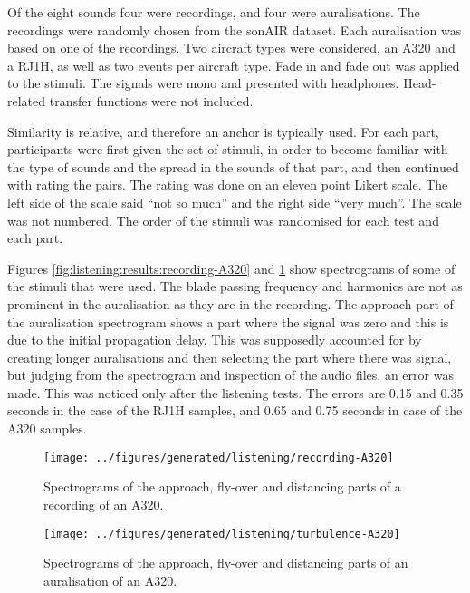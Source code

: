 Of the eight sounds four were recordings, and four were auralisations.
The recordings were randomly chosen from the sonAIR dataset. Each
auralisation was based on one of the recordings. Two aircraft types were
considered, an A320 and a RJ1H, as well as two events per aircraft type.
Fade in and fade out was applied to the stimuli. The signals were mono and
presented with headphones. Head-related transfer functions were not included.

Similarity is relative, and therefore an anchor is typically used. For each
part, participants were first given the set of stimuli, in order to become
familiar with the type of sounds and the spread in the sounds of that part, and
then continued with rating the pairs. The rating was done on an eleven point
Likert scale. The left side of the scale said ``not so much'' and the right side
``very much''. The scale was not numbered. The order of the stimuli was
randomised for each test and each part.

Figures \ref{fig:listening:results:recording-A320} and
\ref{fig:listening:results:simulation-A320} show spectrograms of some of the
stimuli that were used. The blade passing frequency and harmonics are not as
prominent in the auralisation as they are in the recording. The approach-part of
the auralisation spectrogram shows a part where the signal was zero and this is
due to the initial propagation delay. This was supposedly accounted for by
creating longer auralisations and then selecting the part where there was
signal, but judging from the spectrogram and inspection of the audio files, an
error was made. This was noticed only after the listening tests. The errors are
0.15 and 0.35 seconds in the case of the RJ1H samples, and 0.65 and 0.75 seconds
in case of the A320 samples.


\begin{figure}[H]
  \centering
  \texttt{[image: ../figures/generated/listening/recording-A320]}
  \caption{Spectrograms of the approach, fly-over and distancing parts of a recording of an A320.}
  \label{fig:listening:results:recording-A320}
%
  \centering
  \texttt{[image: ../figures/generated/listening/turbulence-A320]}
  \caption{Spectrograms of the approach, fly-over and distancing parts of an auralisation of an A320.}
  \label{fig:listening:results:simulation-A320}
\end{figure}

